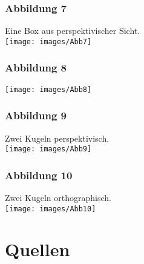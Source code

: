 \documentclass[14pt]{extarticle}
\begin{document}
\subsubsection{Abbildung 7}
Eine Box aus perspektivischer Sicht.\\
\texttt{[image: images/Abb7]}\\

\subsubsection{Abbildung 8}
\texttt{[image: images/Abb8]}\\

\subsubsection{Abbildung 9}
Zwei Kugeln perspektivisch.\\
\texttt{[image: images/Abb9]}\\

\subsubsection{Abbildung 10}
Zwei Kugeln orthographisch.\\
\texttt{[image: images/Abb10]}\\


\section{Quellen}
\end{document}
